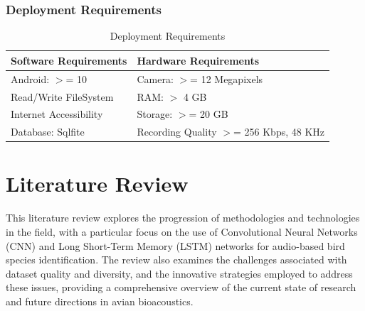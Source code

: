 \subsection{Deployment Requirements}
\begin{table}[ht]
    \centering
    \caption{Deployment Requirements}
    \begin{tabular}{|l|l|}
        \hline
        \textbf{Software Requirements} & \textbf{Hardware Requirements}            \\ \hline
        Android: \(>\)= 10             & Camera: \(>\)= 12 Megapixels              \\ \hline
        Read/Write FileSystem          & RAM: \(>\) 4 GB                           \\ \hline
        Internet Accessibility         & Storage: \(>\)= 20 GB                     \\ \hline
        Database: Sqlfite              & Recording Quality \(>\)= 256 Kbps, 48 KHz \\ \hline
    \end{tabular}
\end{table}

\chapter{Literature Review}

This literature review explores the progression of methodologies and technologies in the field,
with a particular focus on the use of Convolutional Neural Networks (CNN) and Long Short-Term Memory (LSTM) 
networks for audio-based bird species identification. The review also examines the challenges associated
with dataset quality and diversity, and the innovative strategies employed to address these issues,
providing a comprehensive overview of the current state of research and future directions in avian bioacoustics.

